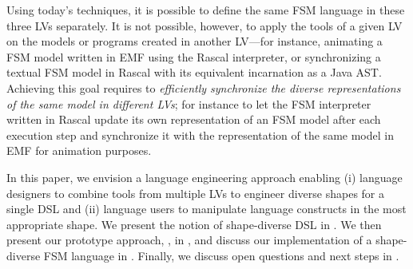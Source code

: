 Using today's techniques, it is possible to define the same FSM language in these three LVs separately.
It is not possible, however, to apply the tools of a given LV on the models or programs created in another LV---for instance, animating a FSM model written in EMF using the Rascal interpreter, or synchronizing a textual FSM model in Rascal with its equivalent incarnation as a Java AST.
Achieving this goal requires to \emph{efficiently synchronize the diverse representations of the same model in different LVs}; for instance to let the FSM interpreter written in Rascal update its own representation of an FSM model after each execution step and synchronize it with the representation of the same model in EMF for animation purposes.

In this paper, we envision a language engineering approach enabling (i) language designers to combine tools from multiple LVs to engineer diverse shapes for a single DSL and (ii) language users to manipulate language constructs in the most appropriate shape.
We present the notion of shape-diverse DSL in .
We then present our prototype approach, \prism, in , and discuss our implementation of a shape-diverse FSM language in .
Finally, we discuss open questions and next steps in .
